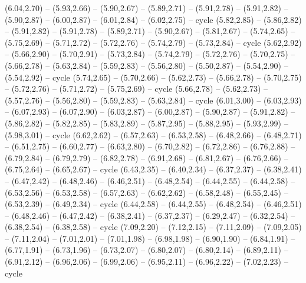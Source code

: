 \expandafter\def\csname geo:gebiet:GHA\endcsname{
  (6.04,2.70) -- (5.93,2.66) -- (5.90,2.67) -- (5.89,2.71) -- (5.91,2.78) -- (5.91,2.82) -- (5.90,2.87) -- (6.00,2.87) -- (6.01,2.84) -- (6.02,2.75) -- cycle}
\expandafter\def\csname geo:gebiet:CIV\endcsname{
  (5.82,2.85) -- (5.86,2.82) -- (5.91,2.82) -- (5.91,2.78) -- (5.89,2.71) -- (5.90,2.67) -- (5.81,2.67) -- (5.74,2.65) -- (5.75,2.69) -- (5.71,2.72) -- (5.72,2.76) -- (5.74,2.79) -- (5.73,2.84) -- cycle}
\expandafter\def\csname geo:gebiet:GIN\endcsname{
  (5.62,2.92) -- (5.66,2.90) -- (5.70,2.91) -- (5.73,2.84) -- (5.74,2.79) -- (5.72,2.76) -- (5.70,2.75) -- (5.66,2.78) -- (5.63,2.84) -- (5.59,2.83) -- (5.56,2.80) -- (5.50,2.87) -- (5.54,2.90) -- (5.54,2.92) -- cycle}
\expandafter\def\csname geo:gebiet:GNB\endcsname{
  }
\expandafter\def\csname geo:gebiet:LBR\endcsname{
  (5.74,2.65) -- (5.70,2.66) -- (5.62,2.73) -- (5.66,2.78) -- (5.70,2.75) -- (5.72,2.76) -- (5.71,2.72) -- (5.75,2.69) -- cycle}
\expandafter\def\csname geo:gebiet:SLE\endcsname{
  (5.66,2.78) -- (5.62,2.73) -- (5.57,2.76) -- (5.56,2.80) -- (5.59,2.83) -- (5.63,2.84) -- cycle}
\expandafter\def\csname geo:gebiet:BFA\endcsname{
  (6.01,3.00) -- (6.03,2.93) -- (6.07,2.93) -- (6.07,2.90) -- (6.03,2.87) -- (6.00,2.87) -- (5.90,2.87) -- (5.91,2.82) -- (5.86,2.82) -- (5.82,2.85) -- (5.83,2.89) -- (5.87,2.95) -- (5.88,2.95) -- (5.93,2.99) -- (5.98,3.01) -- cycle}
\expandafter\def\csname geo:gebiet:CAF\endcsname{
  (6.62,2.62) -- (6.57,2.63) -- (6.53,2.58) -- (6.48,2.66) -- (6.48,2.71) -- (6.51,2.75) -- (6.60,2.77) -- (6.63,2.80) -- (6.70,2.82) -- (6.72,2.86) -- (6.76,2.88) -- (6.79,2.84) -- (6.79,2.79) -- (6.82,2.78) -- (6.91,2.68) -- (6.81,2.67) -- (6.76,2.66) -- (6.75,2.64) -- (6.65,2.67) -- cycle}
\expandafter\def\csname geo:gebiet:COG\endcsname{
  (6.43,2.35) -- (6.40,2.34) -- (6.37,2.37) -- (6.38,2.41) -- (6.47,2.42) -- (6.48,2.46) -- (6.46,2.51) -- (6.48,2.54) -- (6.44,2.55) -- (6.44,2.58) -- (6.53,2.56) -- (6.53,2.58) -- (6.57,2.63) -- (6.62,2.62) -- (6.58,2.48) -- (6.55,2.45) -- (6.53,2.39) -- (6.49,2.34) -- cycle}
\expandafter\def\csname geo:gebiet:GAB\endcsname{
  (6.44,2.58) -- (6.44,2.55) -- (6.48,2.54) -- (6.46,2.51) -- (6.48,2.46) -- (6.47,2.42) -- (6.38,2.41) -- (6.37,2.37) -- (6.29,2.47) -- (6.32,2.54) -- (6.38,2.54) -- (6.38,2.58) -- cycle}
\expandafter\def\csname geo:gebiet:GNQ\endcsname{
  }
\expandafter\def\csname geo:gebiet:ZMB\endcsname{
  (7.09,2.20) -- (7.12,2.15) -- (7.11,2.09) -- (7.09,2.05) -- (7.11,2.04) -- (7.01,2.01) -- (7.01,1.98) -- (6.98,1.98) -- (6.90,1.90) -- (6.84,1.91) -- (6.77,1.91) -- (6.73,1.96) -- (6.73,2.07) -- (6.80,2.07) -- (6.80,2.14) -- (6.89,2.11) -- (6.91,2.12) -- (6.96,2.06) -- (6.99,2.06) -- (6.95,2.11) -- (6.96,2.22) -- (7.02,2.23) -- cycle}

